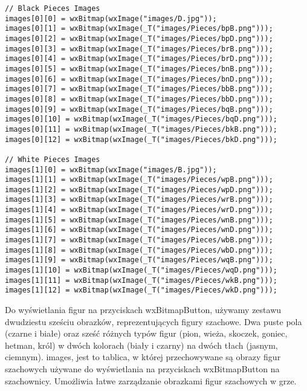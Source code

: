 \documentclass[]{report}
\begin{document}
\begin{lstlisting}
// Black Pieces Images
images[0][0] = wxBitmap(wxImage("images/D.jpg"));
images[0][1] = wxBitmap(wxImage(_T("images/Pieces/bpB.png")));
images[0][2] = wxBitmap(wxImage(_T("images/Pieces/bpD.png")));
images[0][3] = wxBitmap(wxImage(_T("images/Pieces/brB.png")));
images[0][4] = wxBitmap(wxImage(_T("images/Pieces/brD.png")));
images[0][5] = wxBitmap(wxImage(_T("images/Pieces/bnB.png")));
images[0][6] = wxBitmap(wxImage(_T("images/Pieces/bnD.png")));
images[0][7] = wxBitmap(wxImage(_T("images/Pieces/bbB.png")));
images[0][8] = wxBitmap(wxImage(_T("images/Pieces/bbD.png")));
images[0][9] = wxBitmap(wxImage(_T("images/Pieces/bqB.png")));
images[0][10] = wxBitmap(wxImage(_T("images/Pieces/bqD.png")));
images[0][11] = wxBitmap(wxImage(_T("images/Pieces/bkB.png")));
images[0][12] = wxBitmap(wxImage(_T("images/Pieces/bkD.png")));

// White Pieces Images
images[1][0] = wxBitmap(wxImage("images/B.jpg"));
images[1][1] = wxBitmap(wxImage(_T("images/Pieces/wpB.png")));
images[1][2] = wxBitmap(wxImage(_T("images/Pieces/wpD.png")));
images[1][3] = wxBitmap(wxImage(_T("images/Pieces/wrB.png")));
images[1][4] = wxBitmap(wxImage(_T("images/Pieces/wrD.png")));
images[1][5] = wxBitmap(wxImage(_T("images/Pieces/wnB.png")));
images[1][6] = wxBitmap(wxImage(_T("images/Pieces/wnD.png")));
images[1][7] = wxBitmap(wxImage(_T("images/Pieces/wbB.png")));
images[1][8] = wxBitmap(wxImage(_T("images/Pieces/wbD.png")));
images[1][9] = wxBitmap(wxImage(_T("images/Pieces/wqB.png")));
images[1][10] = wxBitmap(wxImage(_T("images/Pieces/wqD.png")));
images[1][11] = wxBitmap(wxImage(_T("images/Pieces/wkB.png")));
images[1][12] = wxBitmap(wxImage(_T("images/Pieces/wkD.png")));
\end{lstlisting}
\vspace{\baselineskip}
Do wyświetlania figur na przyciskach wxBitmapButton, używamy zestawu dwudziestu sześciu obrazków, reprezentujących figury szachowe. Dwa puste pola (czarne i białe) oraz sześć różnych typów figur (pion, wieża, skoczek, goniec, hetman, król) w dwóch kolorach (biały i czarny) na dwóch tłach (jasnym, ciemnym). images, jest to tablica, w której przechowywane są obrazy figur szachowych używane do wyświetlania na przyciskach wxBitmapButton na szachownicy. Umożliwia łatwe zarządzanie obrazkami figur szachowych w grze.
\end{document}
